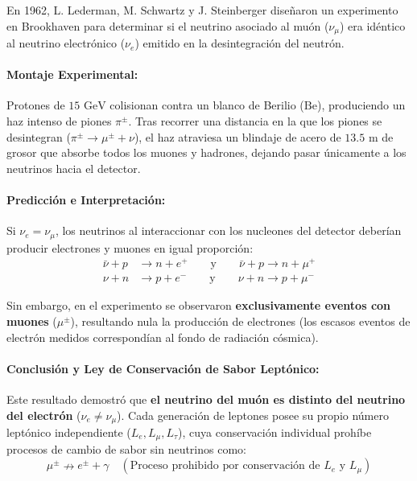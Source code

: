 En 1962, L. Lederman, M. Schwartz y J. Steinberger diseñaron un experimento en Brookhaven para determinar si el neutrino asociado al muón ($\nu_\mu$) era idéntico al neutrino electrónico ($\nu_e$) emitido en la desintegración del neutrón.

\paragraph{Montaje Experimental:}
Protones de $15 \text{ GeV}$ colisionan contra un blanco de Berilio ($\text{Be}$), produciendo un haz intenso de piones $\pi^\pm$. Tras recorrer una distancia en la que los piones se desintegran ($\pi^\pm \to \mu^\pm + \nu$), el haz atraviesa un blindaje de acero de $13.5 \text{ m}$ de grosor que absorbe todos los muones y hadrones, dejando pasar únicamente a los neutrinos hacia el detector.

\paragraph{Predicción e Interpretación:}
Si $\nu_e = \nu_\mu$, los neutrinos al interaccionar con los nucleones del detector deberían producir electrones y muones en igual proporción:
\begin{align}
\bar{\nu} + p &\longrightarrow n + e^+ \qquad \text{y} \qquad \bar{\nu} + p \longrightarrow n + \mu^+ \\
\nu + n &\longrightarrow p + e^- \qquad \text{y} \qquad \nu + n \longrightarrow p + \mu^-
\end{align}

Sin embargo, en el experimento se observaron \textbf{exclusivamente eventos con muones} ($\mu^\pm$), resultando nula la producción de electrones (los escasos eventos de electrón medidos correspondían al fondo de radiación cósmica).

\paragraph{Conclusión y Ley de Conservación de Sabor Leptónico:}
Este resultado demostró que \textbf{el neutrino del muón es distinto del neutrino del electrón} ($\nu_e \neq \nu_\mu$). Cada generación de leptones posee su propio número leptónico independiente ($L_e, L_\mu, L_\tau$), cuya conservación individual prohíbe procesos de cambio de sabor sin neutrinos como:
\begin{equation}
\mu^\pm \nrightarrow e^\pm + \gamma \quad (\text{Proceso prohibido por conservación de } L_e \text{ y } L_\mu)
\end{equation}


